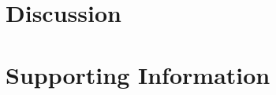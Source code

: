 \documentclass[10pt,letterpaper]{article}
\newcommand{\lorem}{{\bf LOREM}}
\newcommand{\ipsum}{{\bf IPSUM}}
\begin{document}
{\begin{euqation}
\section*{Discussion}
%
%
%
%
\section*{Supporting Information}


\end{euqation}}
\end{document}
